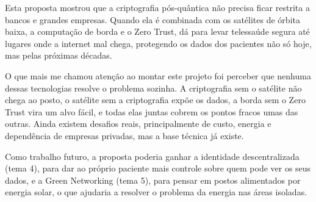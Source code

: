 \documentclass[12pt,a4paper]{article}
\begin{document}
Esta proposta mostrou que a criptografia pós-quântica não precisa ficar restrita a bancos e grandes empresas. Quando ela é combinada com os satélites de órbita baixa, a computação de borda e o Zero Trust, dá para levar telessaúde segura até lugares onde a internet mal chega, protegendo os dados dos pacientes não só hoje, mas pelas próximas décadas.

O que mais me chamou atenção ao montar este projeto foi perceber que nenhuma dessas tecnologias resolve o problema sozinha. A criptografia sem o satélite não chega ao posto, o satélite sem a criptografia expõe os dados, a borda sem o Zero Trust vira um alvo fácil, e todas elas juntas cobrem os pontos fracos umas das outras. Ainda existem desafios reais, principalmente de custo, energia e dependência de empresas privadas, mas a base técnica já existe.

Como trabalho futuro, a proposta poderia ganhar a identidade descentralizada (tema 4), para dar ao próprio paciente mais controle sobre quem pode ver os seus dados, e a Green Networking (tema 5), para pensar em postos alimentados por energia solar, o que ajudaria a resolver o problema da energia nas áreas isoladas.


\end{document}
